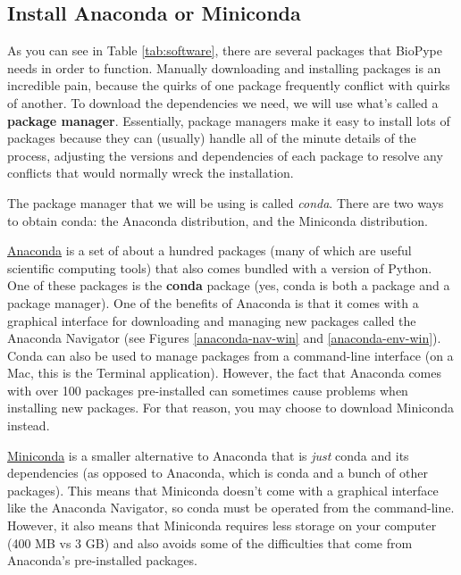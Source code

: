\subsection{Install Anaconda or Miniconda}
As you can see in Table \ref{tab:software}, there are several packages that BioPype needs in order to function. Manually downloading and installing packages is an incredible pain, because the quirks of one package frequently conflict with quirks of another. To download the dependencies we need, we will use what's called a \textbf{package manager}. Essentially, package managers make it easy to install lots of packages because they can (usually) handle all of the minute details of the process, adjusting the versions and dependencies of each package to resolve any conflicts that would normally wreck the installation.

The package manager that we will be using is called \textit{conda}. There are two ways to obtain conda: the Anaconda distribution, and the Miniconda distribution.

\ul{Anaconda} is a set of about a hundred packages (many of which are useful scientific computing tools) that also comes bundled with a version of Python. One of these packages is the \textbf{conda} package (yes, conda is both a package and a package manager). One of the benefits of Anaconda is that it comes with a graphical interface for downloading and managing new packages called the Anaconda Navigator (see Figures \ref{anaconda-nav-win} and \ref{anaconda-env-win}). Conda can also be used to manage packages from a command-line interface (on a Mac, this is the Terminal application). However, the fact that Anaconda comes with over 100 packages pre-installed can sometimes cause problems when installing new packages. For that reason, you may choose to download Miniconda instead.

\ul{Miniconda} is a smaller alternative to Anaconda that is \textit{just} conda and its dependencies (as opposed to Anaconda, which is conda and a bunch of other packages). This means that Miniconda doesn't come with a graphical interface like the Anaconda Navigator, so conda must be operated from the command-line. However, it also means that Miniconda requires less storage on your computer (400 MB vs 3 GB) and also avoids some of the difficulties that come from Anaconda's pre-installed packages. 

